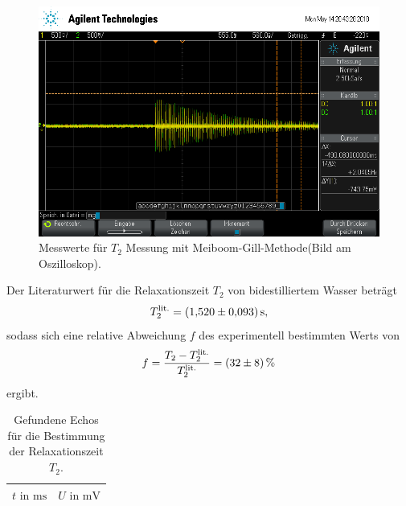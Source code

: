 \begin{figure}[hhh]
  \centering
  \includegraphics[width=\textwidth]{mg.png}
  \caption{Messwerte für $T_{2}$ Messung mit Meiboom-Gill-Methode(Bild am Oszilloskop).}
  \label{fig:meiboomgill}
\end{figure}

Der Literaturwert\cite{litwerte} für die Relaxationszeit $T_{2}$ von bidestilliertem Wasser
beträgt
\begin{align*}
  T_{2}^\text{lit.} = \SI{1.52+-0.093}{\second},
\end{align*}
sodass sich eine relative Abweichung $f$ des experimentell bestimmten Werts
von
\begin{align*}
  f = \frac{T_{2} - T_{2}^\text{lit.}}{T_{2}^\text{lit.}} = \SI{32+-8}{\percent}
\end{align*}
ergibt.


\begin{table}
  \centering
  \caption{Gefundene Echos für die Bestimmung der Relaxationszeit $T_{2}$.}
  \label{tab:t2_fitwerte}
  \begin{tabular}{c c}
  \toprule
  $t \text{ in } \si{\milli\second}$ & $U \text{ in } \si{\milli\volt}$\\
  \midrule
  
  \bottomrule
  \end{tabular}
\end{table}


\FloatBarrier
